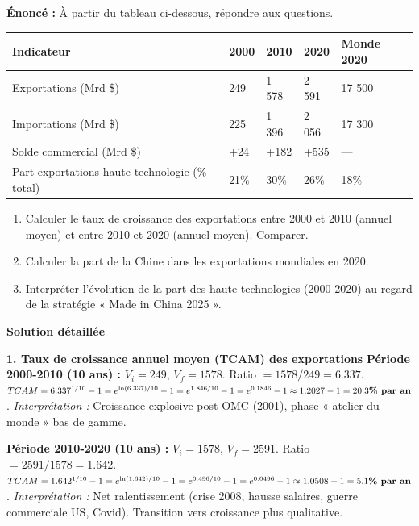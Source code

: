 \documentclass[11pt]{article}
\begin{document}
\begin{exoresolu}
\textbf{Énoncé :} À partir du tableau ci-dessous, répondre aux questions.
\begin{center}
\begin{tabularx}{\linewidth}{|l|X|X|X|X|}\hline
\textbf{Indicateur} & \textbf{2000} & \textbf{2010} & \textbf{2020} & \textbf{Monde 2020} \\ \hline
Exportations (Mrd \$) & 249 & 1 578 & 2 591 & 17 500 \\ \hline
Importations (Mrd \$) & 225 & 1 396 & 2 056 & 17 300 \\ \hline
Solde commercial (Mrd \$) & +24 & +182 & +535 & — \\ \hline
Part exportations haute technologie (\% total) & 21\% & 30\% & 26\% & 18\% \\ \hline
\end{tabularx}
\end{center}
\begin{enumerate}
    \item Calculer le taux de croissance des exportations entre 2000 et 2010 (annuel moyen) et entre 2010 et 2020 (annuel moyen). Comparer.
    \item Calculer la part de la Chine dans les exportations mondiales en 2020.
    \item Interpréter l'évolution de la part des haute technologies (2000-2020) au regard de la stratégie « Made in China 2025 ».
\end{enumerate}

\tcblower
\textbf{Solution détaillée}

\textbf{1. Taux de croissance annuel moyen (TCAM) des exportations}
\textbf{Période 2000-2010 (10 ans) :}
$V_i = 249$, $V_f = 1578$.
Ratio $= 1578 / 249 = \num{6,337}$.
$TCAM = \num{6,337}^{1/10} - 1 = e^{\ln(\num{6,337})/10} - 1 = e^{\num{1,846}/10} - 1 = e^{\num{0,1846}} - 1 \approx \num{1,2027} - 1 = \textbf{\num{20,3}\% par an}$.
\textit{Interprétation :} Croissance explosive post-OMC (2001), phase « atelier du monde » bas de gamme.

\textbf{Période 2010-2020 (10 ans) :}
$V_i = 1578$, $V_f = 2591$.
Ratio $= 2591 / 1578 = \num{1,642}$.
$TCAM = \num{1,642}^{1/10} - 1 = e^{\ln(\num{1,642})/10} - 1 = e^{\num{0,496}/10} - 1 = e^{\num{0,0496}} - 1 \approx \num{1,0508} - 1 = \textbf{\num{5,1}\% par an}$.
\textit{Interprétation :} Net ralentissement (crise 2008, hausse salaires, guerre commerciale US, Covid). Transition vers croissance plus qualitative.


\end{exoresolu}
\end{document}
